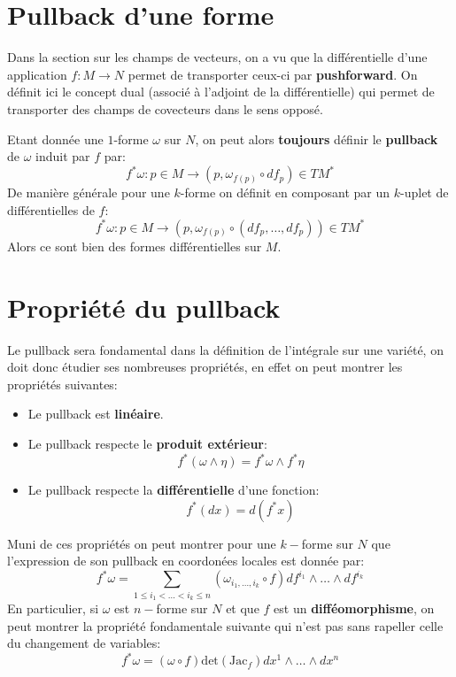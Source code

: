    \section{Pullback d'une forme}
   Dans la section sur les champs de vecteurs, on a vu que la différentielle d'une application \( f : M \longrightarrow N \) permet de transporter ceux-ci par \textbf{pushforward}. On définit ici le concept dual (associé à l'adjoint de la différentielle) qui permet de transporter des champs de covecteurs dans le sens opposé.\<

   Etant donnée une \( 1 \)-forme \( \omega \) sur \( N \), on peut alors \textbf{toujours} définir le \textbf{pullback} de \( \omega \) induit par \( f \) par:
   \[ 
      f^*\omega : p \in M \longrightarrow (p, \omega_{f(p)} \circ df_p) \in TM^*
   \]   
   De manière générale pour une \( k \)-forme on définit en composant par un \( k \)-uplet de différentielles de \( f \):
   \[ 
      f^*\omega : p \in M \longrightarrow (p, \omega_{f(p)} \circ (df_p, \ldots, df_p)) \in TM^*
   \]
   Alors ce sont bien des formes différentielles sur \( M \). 
   \pagebreak
   \section{Propriété du pullback}
      Le pullback sera fondamental dans la définition de l'intégrale sur une variété, on doit donc étudier ses nombreuses propriétés, en effet on peut montrer les propriétés suivantes:
      \begin{itemize}
         \item Le pullback est \textbf{linéaire}.
         \item Le pullback respecte le \textbf{produit extérieur}:
         \[ 
            f^*(\omega \wedge \eta) = f^*\omega \wedge f^*\eta
         \]
         \item Le pullback respecte la \textbf{différentielle} d'une fonction:
         \[ 
            f^*(dx) = d(f^*x)
         \]
      \end{itemize}
      Muni de ces propriétés on peut montrer pour une \( k-\)forme sur \( N \) que l'expression de son pullback en coordonées locales est donnée par:
      \[ 
         f^*\omega = \sum_{1 \leq i_1 < \ldots < i_k \leq n} (\omega_{i_1, \ldots, i_k} \circ f) df^{i_1} \wedge \ldots \wedge df^{i_k}
      \]
      En particulier, si \( \omega \) est \( n-\)forme sur \( N \) et que \( f \) est un \textbf{difféomorphisme}, on peut montrer la propriété fondamentale suivante qui n'est pas sans rapeller celle du changement de variables:
      \[ 
         f^*\omega = (\omega \circ f) \text{det}(\text{Jac}_f) dx^{1} \wedge \ldots \wedge dx^{n}
      \]
